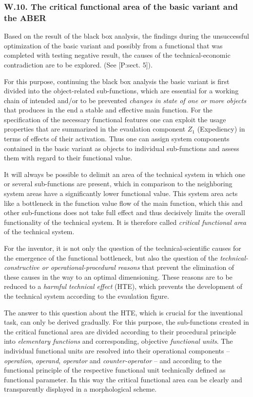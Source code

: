 \documentclass[11pt,a4paper]{article}
\begin{document}
\subsubsection*{W.10. The critical functional area of the basic variant and
  the ABER}

Based on the result of the black box analysis, the findings during the
unsuccessful optimization of the basic variant and possibly from a functional
that was completed with testing negative result, the causes of the
technical-economic contradiction are to be explored. (See [P:sect. 5]).

For this purpose, continuing the black box analysis the basic variant is first
divided into the object-related sub-functions, which are essential for a
working chain of intended and/or to be prevented \emph{changes in state of one
  or more objects} that produces in the end a stable and effective main
function.  For the specification of the necessary functional features one can
exploit the usage properties that are summarized in the evaulation component $Z_1$
(Expediency) in terms of effects of their activation. Thus one can assign
system components contained in the basic variant as objects to individual
sub-functions and assess them with regard to their functional value.

It will always be possible to delimit an area of the technical system in which
one or several sub-functions are present, which in comparison to the
neighboring system areas have a significantly lower functional value. This
system area acts like a bottleneck in the function value flow of the main
function, which this and other sub-functions does not take full effect and
thus decisively limits the overall functionality of the technical system. It
is therefore called \emph{critical functional area} of the technical system.

For the inventor, it is not only the question of the technical-scientific
causes for the emergence of the functional bottleneck, but also the question
of the \emph{technical-constructive or operational-procedural reasons} that
prevent the elimination of these causes in the way to an optimal dimensioning.
These reasons are to be reduced to a \emph{harmful technical effect} (HTE),
which prevents the development of the technical system according to the evaulation
figure.

The answer to this question about the HTE, which is crucial for the
inventional task, can only be derived gradually. For this purpose, the
sub-functions created in the critical functional area are divided according to
their procedural principle into \emph{elementary functions} and corresponding,
objective \emph{functional units}. The individual functional units are
resolved into their operational components -- \emph{operation},
\emph{operand}, \emph{operator} and \emph{counter-operator} -- and according
to the functional principle of the respective functional unit technically
defined as functional parameter. In this way the critical functional area can
be clearly and transparently displayed in a morphological scheme.
\end{document}
